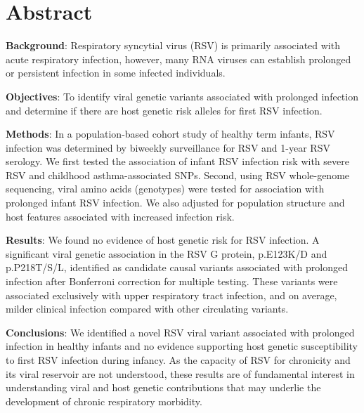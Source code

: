 \documentclass{article} %
\begin{document}
\clearpage
\section{Abstract}
\textbf{Background}: Respiratory syncytial virus (RSV) is primarily associated with acute respiratory infection, however, many RNA viruses can establish prolonged or persistent infection in some infected individuals.

\textbf{Objectives}: To identify viral genetic variants associated with prolonged infection and determine if there are host genetic risk alleles for first RSV infection.

\textbf{Methods}: In a population-based cohort study of healthy term infants, RSV infection was determined by biweekly surveillance for RSV and 1-year RSV serology. 
We first tested the association of infant RSV infection risk with severe RSV and childhood asthma-associated SNPs.
Second, using RSV whole-genome sequencing, viral amino acids (genotypes) were tested for association with 
prolonged infant RSV infection.
We also adjusted for population structure and host features associated with increased infection risk.

\textbf{Results}: We found no evidence of host genetic risk for RSV infection.
A significant viral genetic association in the RSV G protein, p.E123K/D and p.P218T/S/L, identified as candidate causal variants associated with prolonged infection after Bonferroni correction for multiple testing. These variants were associated exclusively with upper respiratory tract infection, and on average, milder clinical infection compared with other circulating variants. 

\textbf{Conclusions}: We identified a novel RSV viral variant associated with prolonged infection in healthy infants and no evidence supporting host genetic susceptibility to first RSV infection during infancy. As the capacity of RSV for chronicity and its viral reservoir are not understood, these results are of fundamental interest in understanding viral and host genetic contributions that may underlie the development of chronic respiratory morbidity.
\end{document}
